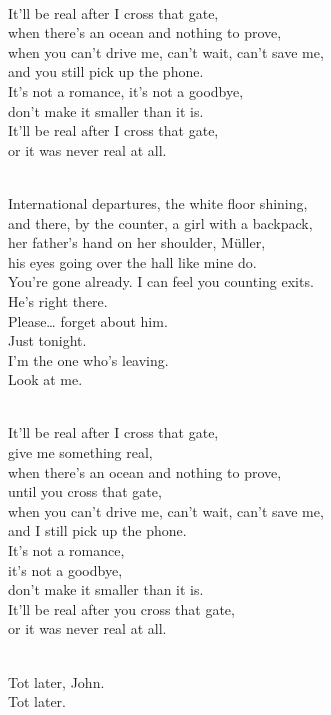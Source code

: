 \begin{lyrics}
\\
It'll be real after I cross that gate,\\
when there's an ocean and nothing to prove,\\
when you can't drive me, can't wait, can't save me,\\
and you still pick up the phone.\\
It's not a romance, it's not a goodbye,\\
don't make it smaller than it is.\\
It'll be real after I cross that gate,\\
or it was never real at all.

\\
International departures, the white floor shining,\\
and there, by the counter, a girl with a backpack,\\
her father's hand on her shoulder, Müller,\\
his eyes going over the hall like mine do.
\\
You're gone already. I can feel you counting exits.
\\
He's right there.
\\
Please… forget about him.\\
Just tonight.\\
I'm the one who's leaving.\\
Look at me.

\\
It'll be real after I cross that gate,
\\
give me something real,
\\
when there's an ocean and nothing to prove,
\\
until you cross that gate,
\\
when you can't drive me, can't wait, can't save me,
\\
and I still pick up the phone.
\\
It's not a romance,
\\
it's not a goodbye,
\\
don't make it smaller than it is.
\\
It'll be real after you cross that gate,
\\
or it was never real at all.

\\
Tot later, John.
\\
Tot later.
\end{lyrics}


